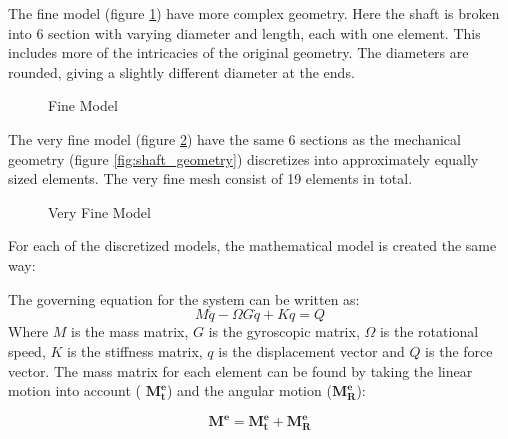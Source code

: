 The fine model (figure \ref{fig:fine_model}) have more complex geometry. Here the shaft is broken into 6 section with varying diameter and length, each with one element. This includes more of the intricacies of the original geometry. The diameters are rounded, giving a slightly different diameter at the ends.
\begin{figure}[ht]
    \centering
    
    \caption{Fine Model}
    \label{fig:fine_model}
\end{figure}

The very fine model (figure \ref{fig:very_fine_model}) have the same 6 sections as the mechanical geometry (figure \ref{fig:shaft_geometry}) discretizes into approximately equally sized elements. The very fine mesh consist of 19 elements in total.
\begin{figure}[ht]
    \centering
    
    \caption{Very Fine Model}
    \label{fig:very_fine_model}
\end{figure}

For each of the discretized models, the mathematical model is created the same way:

The governing equation for the system can be written as:
\begin{equation}
    M \ddot{q} - \Omega G \dot{q} + K q = Q
\end{equation}
Where $M$ is the mass matrix, $G$ is the gyroscopic matrix, $\Omega$ is the rotational speed, $K$ is the stiffness matrix, $q$ is the displacement vector and $Q$ is the force vector. The mass matrix for each element can be found by taking the linear motion into account ( $\mathbf{M_t^e}$) and the angular motion ($\mathbf{M_R^e}$):

\begin{equation}
    \mathbf{M^e} = \mathbf{M_t^e} + \mathbf{M_R^e} 
\end{equation}

